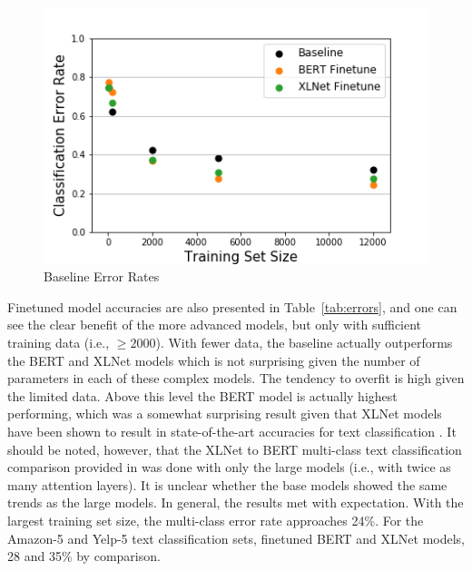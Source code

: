 \documentclass[twoside,twocolumn,10pt]{article}
\begin{document}
\begin{figure}
	\includegraphics[width=\linewidth]{baseline.png}
	\caption{Baseline Error Rates}
	\label{fig:baseline}
\end{figure}

Finetuned model accuracies are also presented in Table~\ref{tab:errors}, and one can see the clear benefit of the more advanced models, but only with sufficient training data (i.e., $\geq 2000$). With fewer data, the baseline actually outperforms the BERT and XLNet models which is not surprising given the number of parameters in each of these complex models. The tendency to overfit is high given the limited data. Above this level the BERT model is actually highest performing, which was a somewhat surprising result given that XLNet models have been shown to result in state-of-the-art accuracies for text classification \cite{Yang:2019}. It should be noted, however, that the XLNet to BERT multi-class text classification comparison provided in \cite{Yang:2019} was done with only the large models (i.e., with twice as many attention layers).  It is unclear whether the base models showed the same trends as the large models.  In general, the results met with expectation. With the largest training set size, the multi-class error rate approaches 24\%. For the Amazon-5 and Yelp-5 text classification sets, finetuned BERT \cite{Vaswani:2017} and XLNet \cite{Yang:2019} models, 28 and 35\% by comparison.
\end{document}
